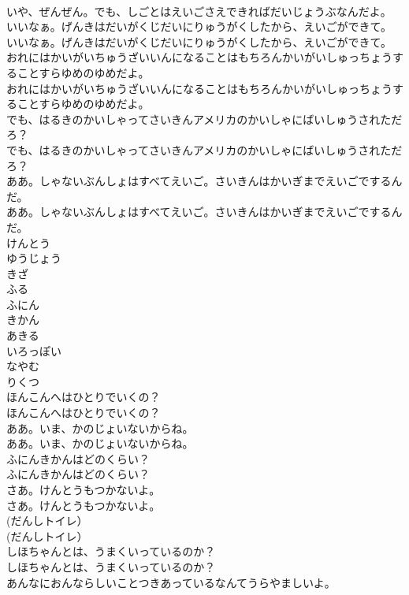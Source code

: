 \documentclass[8pt]{extreport}
\begin{document}
\begin{CJK}{UTF8}{min}
\\	いや、ぜんぜん。でも、しごとはえいごさえできればだいじょうぶなんだよ。 
\\	いいなぁ。げんきはだいがくじだいにりゅうがくしたから、えいごができて。	
\\	いいなぁ。げんきはだいがくじだいにりゅうがくしたから、えいごができて。 
\\	おれにはかいがいちゅうざいいんになることはもちろんかいがいしゅっちょうすることすらゆめのゆめだよ。	
\\	おれにはかいがいちゅうざいいんになることはもちろんかいがいしゅっちょうすることすらゆめのゆめだよ。 
\\	でも、はるきのかいしゃってさいきんアメリカのかいしゃにばいしゅうされただろ？	
\\	でも、はるきのかいしゃってさいきんアメリカのかいしゃにばいしゅうされただろ？ 
\\	ああ。しゃないぶんしょはすべてえいご。さいきんはかいぎまでえいごでするんだ。	
\\	ああ。しゃないぶんしょはすべてえいご。さいきんはかいぎまでえいごでするんだ。 
\\	けんとう
\\	ゆうじょう
\\	きざ
\\	ふる
\\	ふにん
\\	きかん
\\	あきる
\\	いろっぽい
\\	なやむ
\\	りくつ
\\	ほんこんへはひとりでいくの？	
\\	ほんこんへはひとりでいくの？ 
\\	ああ。いま、かのじょいないからね。	
\\	ああ。いま、かのじょいないからね。 
\\	ふにんきかんはどのくらい？	
\\	ふにんきかんはどのくらい？ 
\\	さあ。けんとうもつかないよ。	
\\	さあ。けんとうもつかないよ。 
\\	(だんしトイレ）	
\\	(だんしトイレ） 
\\	しほちゃんとは、うまくいっているのか？	
\\	しほちゃんとは、うまくいっているのか？ 
\\	あんなにおんならしいことつきあっているなんてうらやましいよ。	

\end{CJK}
\end{document}
